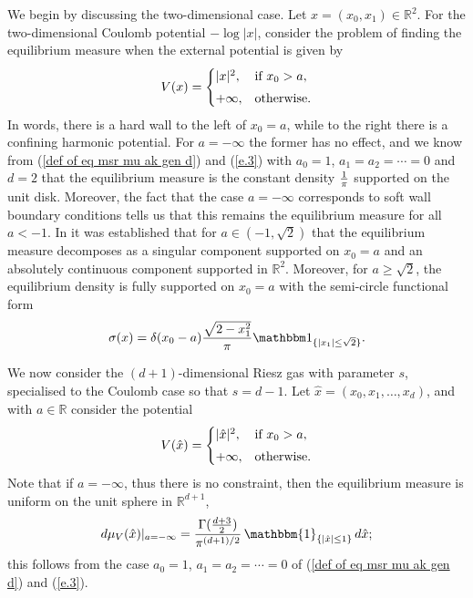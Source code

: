 \documentclass[10pt]{amsart}
\def\R{\mathbb{R}}
\theoremstyle{plain}
\theoremstyle{remark}
\numberwithin{equation}{section}
\begin{document}
We begin by discussing the two-dimensional case.
Let $x = (x_0,x_1) \in \mathbb R^2$. For the two-dimensional Coulomb potential $- \log |x|$, consider the problem of finding the equilibrium measure when the external potential is given by
\begin{equation}\label{V1}
V({x}) = \begin{cases}
|{x}|^2, &\textup{if } x_0 > a,
\smallskip 
\\
+\infty, &\textup{otherwise}. 
\end{cases}
\end{equation}
In words, there is a hard wall to the left of $x_0 = a$, while to the right there is a confining harmonic potential. For $a=-\infty$ the former has no effect, and we know from 
(\ref{def of eq msr mu ak gen d}) and (\ref{e.3}) with $a_0=1$, $a_1=a_2=\cdots=0$ and $d=2$  that the equilibrium measure is the constant density ${1 \over \pi}$ supported on the unit disk. Moreover, the fact that the case $a=-\infty$ corresponds to soft wall boundary conditions tells us that this remains the equilibrium measure for all $a <-1$. In \cite{ASZ14} it was established that for $a \in (-1,\sqrt{2})$ that the equilibrium measure decomposes as a singular component supported on $x_0 = a$ and an absolutely continuous  component supported in $\mathbb R^2$. Moreover, for $a \ge \sqrt{2}$, the equilibrium density is fully supported on $x_0=a$
with the semi-circle functional form
\begin{equation}\label{V2}
\sigma(x) = \delta(x_0-a) {\sqrt{2 - x_1^2} \over \pi}
\mathbbm 1_{\{|x_1| \le \sqrt{2}\}}.
\end{equation}
 
We now consider the $(d+1)$-dimensional Riesz gas with parameter $s$, specialised to the Coulomb case so that
$s=d-1$.   
Let $\hat{x}=(x_0,x_1,\dots,x_d)$, %
and with $a \in \R$ consider the potential
\begin{equation}\label{3.1}
V(\hat{x}) = \begin{cases}
|\hat{x}|^2, &\textup{if } x_0 > a,
\smallskip 
\\
+\infty, &\textup{otherwise}. 
\end{cases}
\end{equation} 
Note that if $a=-\infty$, thus there is no constraint, then the equilibrium measure is uniform on the unit sphere in $\R^{d+1}$, 
 \begin{equation}  \label{def of eq msr without constriant}
d\mu_{V}(\hat{x})|_{a=-\infty} = \frac{ \Gamma(\frac{d+3}{2}) }{\pi^{ (d+1)/2 }}\, \mathbbm{1}_{ \{ |\hat{x}| \le 1 \} } \,d\hat{x}; 
\end{equation} 
this follows from the case $a_0=1$, $a_1=a_2=\cdots=0$ of (\ref{def of eq msr mu ak gen d}) and (\ref{e.3}). 
\end{document}
